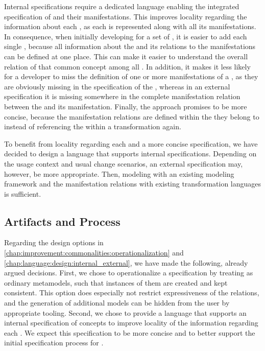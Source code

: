Internal specifications require a dedicated language enabling the integrated specification of \commonalities and their manifestations.
This improves locality regarding the information about each \commonality, as each \commonality is represented along with all its manifestations.
In consequence, when initially developing \commonalities for a set of \concretemetamodels, it is easier to add each single \commonality, because all information about the \commonality and its relations to the manifestations can be defined at one place.
This can make it easier to understand the overall relation of that common concept among all \concretemetamodels.
In addition, it makes it less likely for a developer to miss the definition of one or more manifestations of a \commonality, as they are obviously missing in the specification of the \commonality, whereas in an external specification it is missing somewhere in the complete manifestation relation between the \conceptmetamodel and its manifestation.
Finally, the approach promises to be more concise, because the manifestation relations are defined within the \commonality they belong to instead of referencing the \commonality within a transformation again.

To benefit from locality regarding each \commonality and a more concise specification, we have decided to design a language that supports internal specifications.
Depending on the usage context and usual change scenarios, an external specification may, however, be more appropriate.
Then, modeling \concretemetamodels with an existing modeling framework and the manifestation relations with existing transformation languages is sufficient.


\subsection{Artifacts and Process}
\label{chap:language:design:artifacts_process}

Regarding the design options in \autoref{chap:improvement:commonalities:operationalization} and \autoref{chap:language:design:internal_external}, we have made the following, already argued decisions.
First, we chose to operationalize a specification by treating \conceptmetamodels as ordinary metamodels, such that instances of them are created and kept consistent.
This option does especially not restrict expressiveness of the relations, and the generation of additional models can be hidden from the user by appropriate tooling.
Second, we chose to provide a language that supports an internal specification of concepts to improve locality of the information regarding each \commonality.
We expect this specification to be more concise and to better support the initial specification process for \commonalities.

